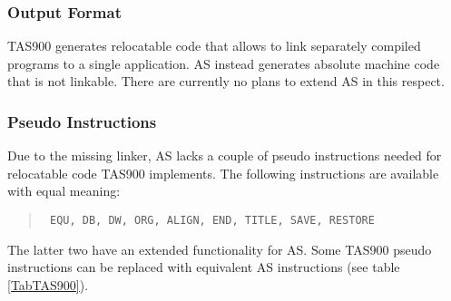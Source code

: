 \documentclass[12pt,twoside]{report}
\begin{document}
\subsubsection{Output Format}

TAS900 generates relocatable code that allows to link separately
compiled programs to a single application.  AS instead generates
absolute machine code that is not linkable.  There are currently no
plans to extend AS in this respect.

\subsubsection{Pseudo Instructions}

Due to the missing linker, AS lacks a couple of pseudo instructions
needed for relocatable code TAS900 implements.  The following
instructions are available with equal meaning:
\begin{quote}\tt
   EQU, DB, DW, ORG, ALIGN, END, TITLE, SAVE, RESTORE
\rm\end{quote}
The latter two have an extended functionality for AS.  Some TAS900
pseudo instructions can be replaced with equivalent AS instructions (see
table \ref{TabTAS900}).
\par
\end{document}
